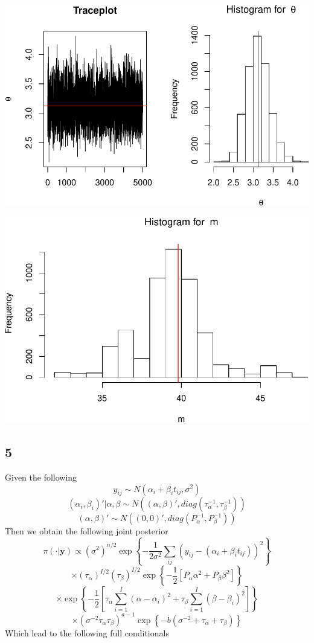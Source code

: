 \documentclass[]{article}
\begin{document}
\includegraphics{AMS206b_H4_files/figure-latex/unnamed-chunk-35-1.pdf}

\includegraphics{AMS206b_H4_files/figure-latex/unnamed-chunk-36-1.pdf}

\subsection{5}\label{section-2}

Given the following
\[y_{ij} \sim N\left(\alpha_i + \beta_i t_{ij}, \sigma^2 \right) \]
\[ (\alpha_i, \beta_i)'|\alpha, \beta \sim N\left((\alpha,\beta)', diag(\tau_\alpha^{-1}, \tau_\beta^{-1}) \right) \]
\[(\alpha, \beta)' \sim N \left((0,0)', diag(P_\alpha^{-1}, P_\beta^{-1}) \right)  \]
Then we obtain the following joint posterior
\[\pi(\cdot|\pmb{y}) \propto (\sigma^2)^{n/2} \exp\left\{-\frac{1}{2\sigma^2} \sum_{ij}(y_{ij} - (\alpha_i + \beta_i t_{ij}))^2 \right\} \]
\[\times (\tau_\alpha)^{I/2}(\tau_\beta)^{I/2}\exp\left\{-\frac{1}{2}\left[P_\alpha \alpha^2 + P_\beta  \beta^2\right] \right\} \]
\[\times \exp\left\{- \frac{1}{2}\left[\tau_\alpha \sum_{i = 1}^I (\alpha - \alpha_i)^2 + \tau_\beta \sum_{i = 1}^I(\beta - \beta_i)^2 \right] \right\} \]
\[\times (\sigma^{-2}\tau_\alpha \tau_\beta)^{a-1} \exp \left\{ -b(\sigma^{-2} + \tau_\alpha + \tau_\beta) \right\} \]
Which lead to the following full conditionals
\end{document}
